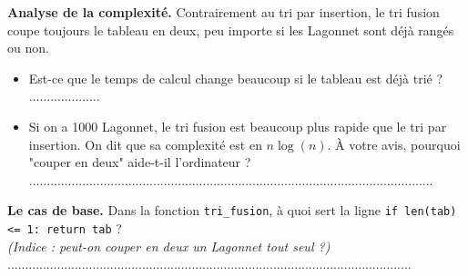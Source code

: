 \begin{Exercise}[title={La stratégie de Maki Tire-Vite, le cow-boy du lagon}]
\Question \textbf{Analyse de la complexité.}
Contrairement au tri par insertion, le tri fusion coupe toujours le tableau en deux, peu importe si les Lagonnet sont déjà rangés ou non.
\begin{itemize}
    \item Est-ce que le temps de calcul change beaucoup si le tableau est déjà trié ? ....................
    \item Si on a 1000 Lagonnet, le tri fusion est beaucoup plus rapide que le tri par insertion. On dit que sa complexité est en $n \log(n)$. À votre avis, pourquoi "couper en deux" aide-t-il l'ordinateur ? \\
    ..................................................................................................................
\end{itemize}

\Question \textbf{Le cas de base.}
Dans la fonction \texttt{tri\_fusion}, à quoi sert la ligne \texttt{if len(tab) <= 1: return tab} ? \\
\textit{(Indice : peut-on couper en deux un Lagonnet tout seul ?)} \\
..................................................................................................................

\end{Exercise}